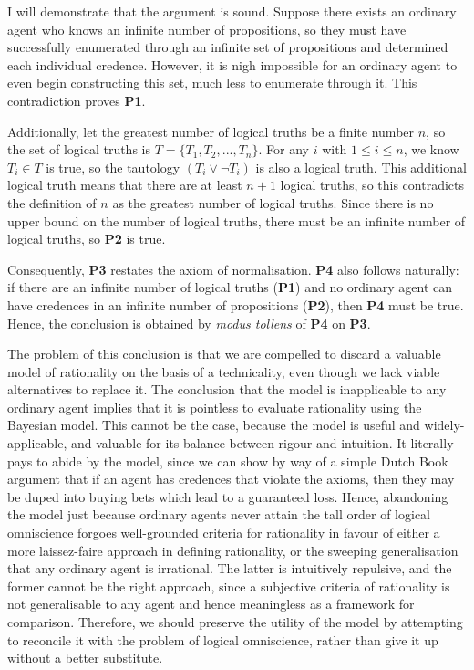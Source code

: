 \documentclass[12pt]{article}
\begin{document}
I will demonstrate that the argument is sound. Suppose there exists an ordinary agent who knows an infinite number of propositions, so they must have successfully enumerated through an infinite set of propositions and determined each individual credence. However, it is nigh impossible for an ordinary agent to even begin constructing this set, much less to enumerate through it. This contradiction proves \textbf{P1}.

Additionally, let the greatest number of logical truths be a finite number $n$, so the set of logical truths is $T=\{T_1,T_2,...,T_n\}$. For any $i$ with $1\leq i\leq n$, we know $T_i\in T$ is true, so the tautology $(T_i\lor\lnot T_i)$ is also a logical truth. This additional logical truth means that there are at least $n+1$ logical truths, so this contradicts the definition of $n$ as the greatest number of logical truths. Since there is no upper bound on the number of logical truths, there must be an infinite number of logical truths, so \textbf{P2} is true.

Consequently, \textbf{P3} restates the axiom of normalisation. \textbf{P4} also follows naturally: if there are an infinite number of logical truths (\textbf{P1}) and no ordinary agent can have credences in an infinite number of propositions (\textbf{P2}), then \textbf{P4} must be true. Hence, the conclusion is obtained by \textit{modus tollens} of \textbf{P4} on \textbf{P3}.

The problem of this conclusion is that we are compelled to discard a valuable model of rationality on the basis of a technicality, even though we lack viable alternatives to replace it. The conclusion that the model is inapplicable to any ordinary agent implies that it is pointless to evaluate rationality using the Bayesian model. This cannot be the case, because the model is useful and widely-applicable, and valuable for its balance between rigour and intuition. It literally pays to abide by the model, since we can show by way of a simple Dutch Book argument that if an agent has credences that violate the axioms, then they may be duped into buying bets which lead to a guaranteed loss.\autocite[44]{bdrc} Hence, abandoning the model just because ordinary agents never attain the tall order of logical omniscience forgoes well-grounded criteria for rationality in favour of either a more laissez-faire approach in defining rationality, or the sweeping generalisation that any ordinary agent is irrational. The latter is intuitively repulsive, and the former cannot be the right approach, since a subjective criteria of rationality is not generalisable to any agent and hence meaningless as a framework for comparison. Therefore, we should preserve the utility of the model by attempting to reconcile it with the problem of logical omniscience, rather than give it up without a better substitute.
\end{document}

